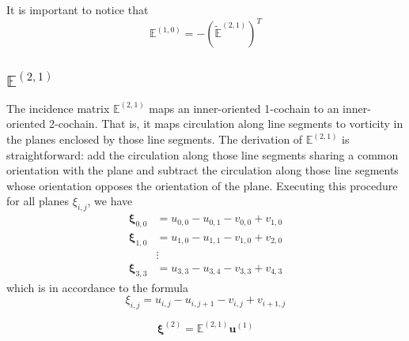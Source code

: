 It is important to notice that
\begin{equation}
    \mathbb{E}^{(1,0)} = -\left(\tilde{\mathbb{E}}^{(2,1)}\right)^T
\end{equation}

\subsection{$\mathbb{E}^{(2,1)}$}

The incidence matrix $\mathbb{E}^{(2,1)}$ maps an inner-oriented 1-cochain to an inner-oriented 2-cochain. That is, it maps circulation along line segments to vorticity in the planes enclosed by those line segments. The derivation of $\mathbb{E}^{(2,1)}$ is straightforward: add the circulation along those line segments sharing a common orientation with the plane and subtract the circulation along those line segments whose orientation opposes the orientation of the plane. Executing this procedure for all planes $\xi_{i,j}$, we have
\begin{equation}
    \begin{split}
        \mathbf{\xi}_{0,0} &= u_{0,0} - u_{0,1} - v_{0,0} + v_{1,0} \\
        \mathbf{\xi}_{1,0} &= u_{1,0} - u_{1,1} - v_{1,0} + v_{2,0} \\
        &\vdots \\
        \mathbf{\xi}_{3,3} &= u_{3,3} - u_{3,4} - v_{3,3} + v_{4,3}
    \end{split}
\end{equation}
which is in accordance to the formula
\begin{equation}
    \xi_{i,j} = u_{i,j} - u_{i,j+1} - v_{i,j} + v_{i+1,j}
\end{equation}

\begin{equation}
    \mathbf{\xi}^{(2)} = \mathbb{E}^{(2,1)} \mathbf{u}^{(1)}
\end{equation}

